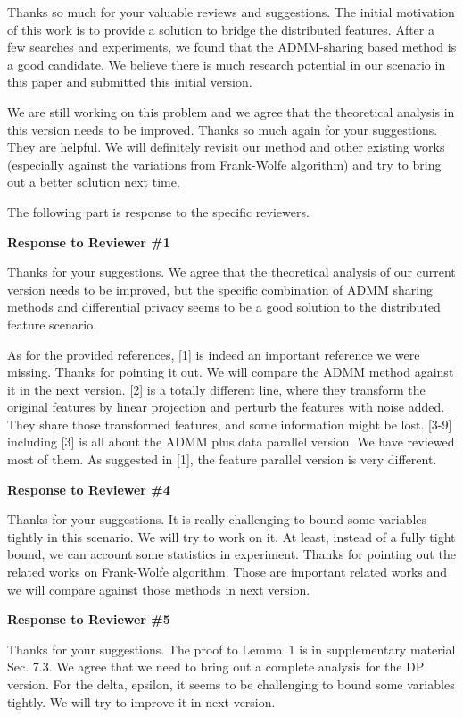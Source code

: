 \documentclass{article}
\begin{document}
Thanks so much for your valuable reviews and suggestions. The initial motivation of this work is to provide a solution to bridge the distributed features. After a few searches and experiments, we found that the ADMM-sharing based method is a good candidate. We believe there is much research potential in our scenario in this paper and submitted this initial version. 

We are still working on this problem and we agree that the theoretical analysis in this version needs to be improved. Thanks so much again for your suggestions. They are helpful. We will definitely revisit our method and other existing works (especially against the variations from Frank-Wolfe algorithm) and try to bring out a better solution next time. 

The following part is response to the specific reviewers. 

\textbf{Response to Reviewer \#1}

Thanks for your suggestions. We agree that the theoretical analysis of our current version needs to be improved, but the specific combination of ADMM sharing methods and differential privacy seems to be a good solution to the distributed feature scenario. 

As for the provided references, [1] is indeed an important reference we were missing. Thanks for pointing it out. We will compare the ADMM method against it in the next version. [2] is a totally different line, where they transform the original features by linear projection and perturb the features with noise added. They share those transformed features, and some information might be lost. [3-9] including [3] is all about the ADMM plus data parallel version. We have reviewed most of them. As suggested in [1], the feature parallel version is very different. 

\textbf{Response to Reviewer \#4}

Thanks for your suggestions. It is really challenging to bound some variables tightly in this scenario. We will try to work on it. At least, instead of a fully tight bound, we can account some statistics in experiment. Thanks for pointing out the related works on Frank-Wolfe algorithm. Those are important related works and we will compare against those methods in next version. 

\textbf{Response to Reviewer \#5}

Thanks for your suggestions. The proof to Lemma~1 is in supplementary material Sec. 7.3. We agree that we need to bring out a complete analysis for the DP version. For the delta, epsilon, it seems to be challenging to bound some variables tightly. We will try to improve it in next version. 
\end{document}
